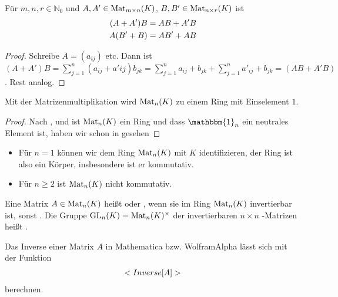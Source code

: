 \begin{lemma}
	Für $m,n,r\in \mathbb N_0$ und $A,A'\in \Mat_{m\times n}(K)$, $B,B'\in \Mat_{n\times r}(K)$ ist
	 \begin{align}
	 	(A+A')B&=AB+A'B\notag \\
	 	A(B'+B)&=AB'+AB\notag
	 \end{align}
\end{lemma}
\begin{proof}
	Schreibe $A=(a_{ij})$ etc. Dann ist $(A+A')B=\sum_{j=1}^n (a_{ij}+a'{ij})b_{jk}=\sum_{j=1}^n 
	a_{ij}+b_{jk} + \sum_{j=1}^n a'_{ij}+b_{jk}=(AB+A'B)$. Rest analog.
\end{proof}

\begin{proposition}
	Mit der Matrizenmultiplikation wird $\Mat_n(K)$ zu einem Ring mit Einselement $1$.
\end{proposition}
\begin{proof}
	Nach ,  und  ist $\Mat_n(K)$ ein Ring und dass $\mathbbm{1}_n$ ein neutrales Element ist, haben wir schon in  gesehen
\end{proof}

\begin{example}
	\begin{itemize}
		\item Für $n=1$ können wir dem Ring $\Mat_n(K)$ mit $K$ identifizieren, der Ring ist also ein Körper, 
		insbesondere ist er kommutativ.
		\item Für $n\ge 2$ ist $\Mat_n(K)$ nicht kommutativ.
	\end{itemize}
\end{example}

\begin{definition}[invertierbar]
	Eine Matrix $A\in \Mat_n(K)$ heißt  oder , wenn sie im Ring 
	$\Mat_n(K)$ invertierbar ist, sonst . Die Gruppe $\GL_n(K)=\Mat_n(K)^{\times}$ der invertierbaren $n\times n$
	-Matrizen heißt .
\end{definition}

\begin{mathematica}
	Das Inverse einer Matrix $A$ in Mathematica bzw. WolframAlpha lässt sich mit der Funktion
	\begin{align}
		\texttt{Inverse[A]}\notag
	\end{align}
	berechnen.
\end{mathematica}

